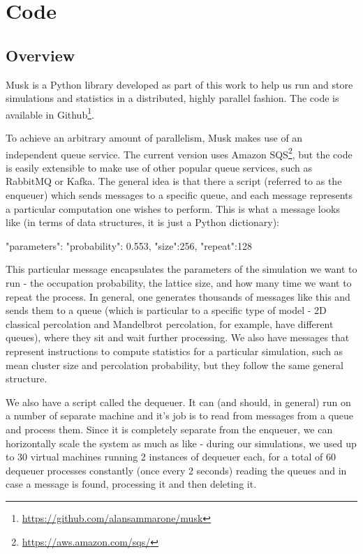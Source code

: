 \chapter{Code}


\section{Overview}
Musk is a Python library developed as part of this work to help us run and store simulations and statistics in a distributed, highly parallel fashion. The code is available in Github\footnote{\url{https://github.com/alansammarone/musk}}.

To achieve an arbitrary amount of parallelism, Musk makes use of an independent queue service. The current version uses Amazon SQS\footnote{\url{https://aws.amazon.com/sqs/}}, but the code is easily extensible to make use of other popular queue services, such as RabbitMQ or Kafka. The general idea is that there a script (referred to as the enqueuer) which sends messages to a specific queue, and each message represents a particular computation one wishes to perform. This is what a message looks like (in terms of data structures, it is just a Python dictionary):

\begin{python}
{
    "parameters": {
        "probability": 0.553, 
        "size":256,
        "repeat":128
    } 
}

\end{python}

This particular message encapsulates the parameters of the simulation we want to run - the occupation probability, the lattice size, and how many time we want to repeat the process. In general, one generates thousands of messages like this and sends them to a queue (which is particular to a specific type of model - 2D classical percolation and Mandelbrot percolation, for example, have different queues), where they sit and wait further processing. We also have messages that represent instructions to compute statistics for a particular simulation, such as mean cluster size and percolation probability, but they follow the same general structure.


We also have a script called the dequeuer. It can (and should, in general) run on a number of separate machine and it's job is to read from messages from a queue and process them. Since it is completely separate from the enqueuer, we can horizontally scale the system as much as like - during our simulations, we used up to 30 virtual machines running 2 instances of dequeuer each, for a total of 60 dequeuer processes constantly (once every 2 seconds) reading the queues and in case a message is found, processing it and then deleting it. 

